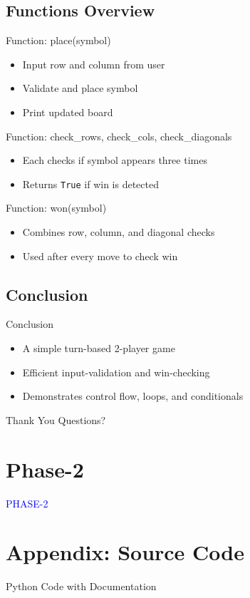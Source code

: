 \documentclass{beamer}
\begin{document}
\subsection{Functions Overview}
\begin{frame}{Function: place(symbol)}
\begin{itemize}
  \item Input row and column from user
  \item Validate and place symbol
  \item Print updated board
\end{itemize}
\end{frame}

\begin{frame}{Function: check\_rows, check\_cols, check\_diagonals}
\begin{itemize}
  \item Each checks if symbol appears three times
  \item Returns \texttt{True} if win is detected
\end{itemize}
\end{frame}

\begin{frame}{Function: won(symbol)}
\begin{itemize}
  \item Combines row, column, and diagonal checks
  \item Used after every move to check win
\end{itemize}
\end{frame}

\subsection{Conclusion}
\begin{frame}{Conclusion}
\begin{itemize}
  \item A simple turn-based 2-player game
  \item Efficient input-validation and win-checking
  \item Demonstrates control flow, loops, and conditionals
\end{itemize}
\end{frame}

\begin{frame}{Thank You}
  \centering
  Questions?
\end{frame}


\section{Phase-2}
\begin{frame}
\centering
\Huge \textcolor{blue}{PHASE-2}
\end{frame}



\appendix
\section{Appendix: Source Code}
\begin{frame}[allowframebreaks]{Python Code with Documentation}

\end{frame}
\end{document}
